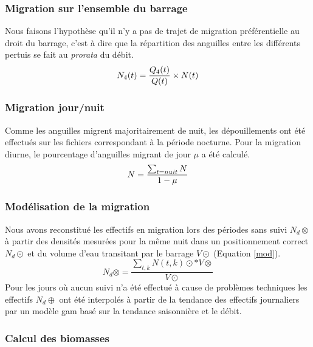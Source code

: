 \documentclass[11pt,twocolumn,titlepage,twoside]{article}
\begin{document}
\subsubsection{Migration sur l'ensemble du barrage}

Nous faisons l'hypothèse qu'il n'y a pas de trajet de migration préférentielle
au droit du barrage, c'est à dire que la répartition des anguilles entre les
différents pertuis se fait au \textit{prorata} du débit. 
\begin{equation}
\label{eq_Ntotal}
N_4(t) = \frac{Q_4(t)} {Q(t)} \times N(t)\\
\end{equation}

\subsubsection{Migration jour/nuit}

Comme les anguilles migrent majoritairement de nuit, les dépouillements ont été
effectués sur les fichiers correspondant à la période nocturne. Pour la
migration diurne, le pourcentage d'anguilles migrant de jour $\mu$ a été calculé.
\begin{equation}
\label{eq_mu}
N = \frac{\sum_{t=nuit}N}{1-\mu}\\
\end{equation}

\subsubsection{Modélisation de la migration}
Nous avons reconstitué les
effectifs en migration lors des périodes sans suivi $N_d\otimes$ à partir des densités mesurées 
pour la même nuit dans un positionnement correct $N_d\odot$ et du volume d'eau
transitant par le barrage $V\odot$ (Equation \ref{mod}).
\begin{equation}
\label{mod}
N_d\otimes=\frac{\sum_{t,k} N(t,k)\odot*V\otimes}{V\odot}
\end{equation}
Pour les jours où aucun suivi n'a été effectué à cause de problèmes
techniques les effectifs $N_d\oplus$ ont été interpolés à partir de la tendance
des effectifs journaliers par un modèle gam basé sur la
tendance saisonnière et le débit.

\subsubsection{Calcul des biomasses}
\end{document}
